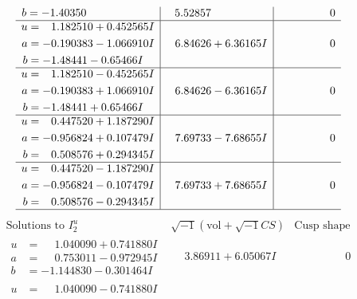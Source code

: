 \documentclass[1p]{elsarticle_modified}
\theoremstyle{definition}
\newcommand{\I}{\sqrt{-1}}
\begin{document}
$$\begin{array}{c|c|c}
\begin{aligned}
b &= -1.40350\phantom{ +0.000000I}\end{aligned}
 & \phantom{-}5.52857\phantom{ +0.000000I} & \phantom{-0.000000 } 0 \\ \hline\begin{aligned}
u &= \phantom{-}1.182510 + 0.452565 I \\
a &= -0.190383 - 1.066910 I \\
b &= -1.48441 - 0.65466 I\end{aligned}
 & \phantom{-}6.84626 + 6.36165 I & \phantom{-0.000000 } 0 \\ \hline\begin{aligned}
u &= \phantom{-}1.182510 - 0.452565 I \\
a &= -0.190383 + 1.066910 I \\
b &= -1.48441 + 0.65466 I\end{aligned}
 & \phantom{-}6.84626 - 6.36165 I & \phantom{-0.000000 } 0 \\ \hline\begin{aligned}
u &= \phantom{-}0.447520 + 1.187290 I \\
a &= -0.956824 + 0.107479 I \\
b &= \phantom{-}0.508576 + 0.294345 I\end{aligned}
 & \phantom{-}7.69733 - 7.68655 I & \phantom{-0.000000 } 0 \\ \hline\begin{aligned}
u &= \phantom{-}0.447520 - 1.187290 I \\
a &= -0.956824 - 0.107479 I \\
b &= \phantom{-}0.508576 - 0.294345 I\end{aligned}
 & \phantom{-}7.69733 + 7.68655 I & \phantom{-0.000000 } 0\\
 \hline 
 \end{array}$$\newpage$$\begin{array}{c|c|c}  
\text{Solutions to }I^u_{2}& \I (\text{vol} + \sqrt{-1}CS) & \text{Cusp shape}\\
 \hline 
\begin{aligned}
u &= \phantom{-}1.040090 + 0.741880 I \\
a &= \phantom{-}0.753011 - 0.972945 I \\
b &= -1.144830 - 0.301464 I\end{aligned}
 & \phantom{-}3.86911 + 6.05067 I & \phantom{-0.000000 } 0 \\ \hline\begin{aligned}
u &= \phantom{-}1.040090 - 0.741880 I \\

\end{aligned}
\end{array}$$
\end{document}
